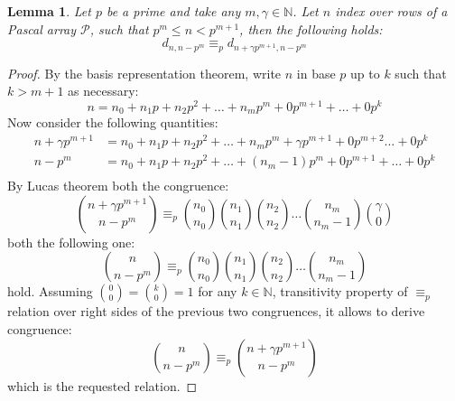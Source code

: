\documentclass[11pt,a4paper]{article} %
\newtheorem{lemma}[theorem]{Lemma}
\begin{document}
    \begin{lemma}
        Let $p$ be a prime and take any $m, \gamma \in \mathbb{N}$. Let $n$ index
        over rows of a Pascal array $\mathcal{P}$, such that $p^{m} \leq n < p^{m+1}$, then the following holds:
        \begin{displaymath}
            d_{n,n-p^{m}} \equiv_{p} d_{n+\gamma p^{m+1}, n-p^{m}}
        \end{displaymath}
    \end{lemma}
    \begin{proof} %
        By the basis representation theorem, write $n$  in base $p$ up to $k$ such that $k > m+1$ as necessary:
        \begin{displaymath}
            n = n_{0} + n_{1}p + n_{2}p^2 + \ldots + n_{m}p^m + 0p^{m+1} + \ldots + 0p^k
        \end{displaymath}
        Now consider the following quantities:
        \begin{displaymath}
            \begin{split}
                n +\gamma p^{m+1} &= n_{0} + n_{1}p + n_{2}p^2 + \ldots + n_{m}p^m + \gamma p^{m+1} + 0p^{m+2} \ldots + 0p^k \\
                n - p^{m} &= n_{0} + n_{1}p + n_{2}p^2 + \ldots + (n_{m}-1)p^m + 0p^{m+1} + \ldots + 0p^k \\
            \end{split}
        \end{displaymath}
        By Lucas theorem both the congruence:
        \begin{displaymath}
            {{n+\gamma p^{m+1}} \choose { n - p^{m}}} \equiv_{p} 
                {{n_{0}} \choose {n_{0}}}  
                {{n_{1}} \choose {n_{1}}} 
                {{n_{2}} \choose {n_{2}}}
                \ldots
                {{n_{m}} \choose {n_{m}-1}} 
                {{\gamma} \choose {0}} 
        \end{displaymath}
        both the following one:
        \begin{displaymath}
            {{n} \choose { n - p^{m}}} \equiv_{p} 
                {{n_{0}} \choose {n_{0}}}  
                {{n_{1}} \choose {n_{1}}} 
                {{n_{2}} \choose {n_{2}}}
                \ldots
                {{n_{m}} \choose {n_{m}-1}} 
        \end{displaymath}
        hold. Assuming ${{0}\choose{0}} = {{k}\choose{0}} = 1$ for any $k\in\mathbb{N}$, 
        transitivity property of $\equiv_p$ relation over right sides of
        the previous two congruences, it allows to derive congruence:
        \begin{displaymath}
            {{n} \choose { n - p^{m}}} \equiv_{p} {{n+\gamma p^{m+1}} \choose { n - p^{m}}} 
        \end{displaymath}
        which is the requested relation.
    \end{proof}
\end{document}
